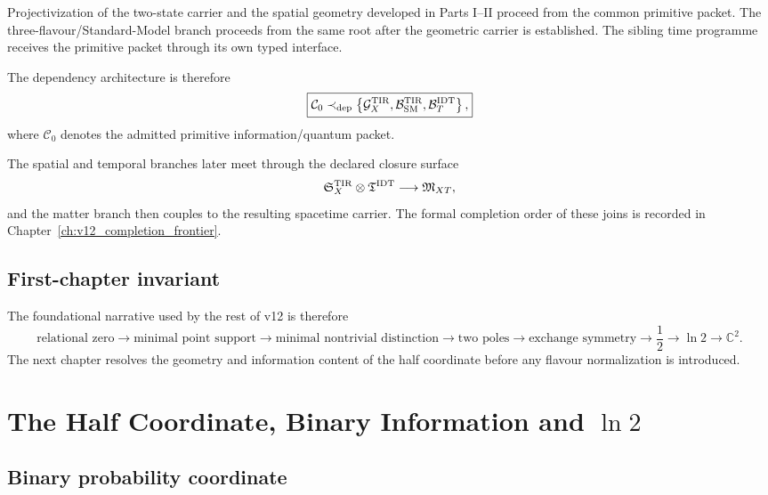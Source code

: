 Projectivization of the two-state carrier and the spatial geometry developed in Parts I--II proceed from the common primitive packet. The three-flavour/Standard-Model branch proceeds from the same root after the geometric carrier is established. The sibling time programme receives the primitive packet through its own typed interface.

The dependency architecture is therefore
\[
\boxed{
\mathcal C_0
\prec_{\rm dep}
\left\{
\mathcal G_X^{\rm TIR},
\mathcal B_{\rm SM}^{\rm TIR},
\mathcal B_T^{\rm IDT}
\right\},
}
\]
where $\mathcal C_0$ denotes the admitted primitive information/quantum packet.

The spatial and temporal branches later meet through the declared closure surface
\begin{equation}
\mathfrak S_X^{\rm TIR}\otimes\mathfrak T^{\rm IDT}
\longrightarrow
\mathfrak M_{XT},
\end{equation}
and the matter branch then couples to the resulting spacetime carrier. The formal completion order of these joins is recorded in Chapter~\ref{ch:v12_completion_frontier}.

\section{First-chapter invariant}

The foundational narrative used by the rest of v12 is therefore
\begin{equation}
\boxed{
\text{relational zero}
\to\text{minimal point support}
\to\text{minimal nontrivial distinction}
\to\text{two poles}
\to\text{exchange symmetry}
\to\frac12
\to\ln2
\to\mathbb C^2.
}
\end{equation}
The next chapter resolves the geometry and information content of the half coordinate before any flavour normalization is introduced.

\clearpage

\chapter[Half Coordinate, Binary Information and ln2]{The Half Coordinate, Binary Information and $\ln2$}
\label{ch:v12_half_ln2}

\section{Binary probability coordinate}

